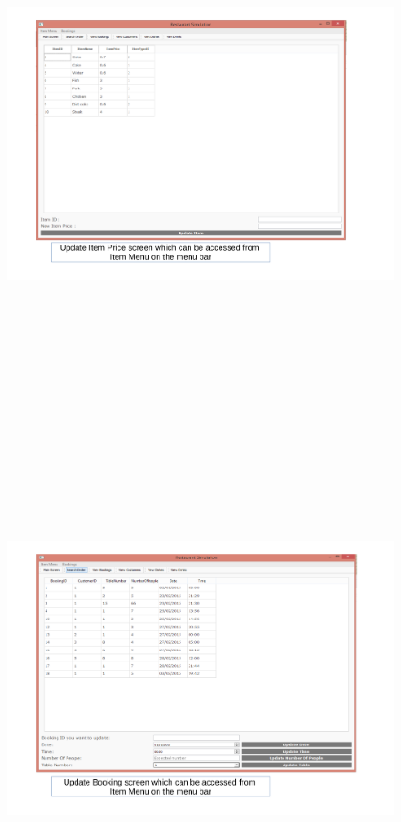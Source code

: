 \begin{landscape}
\begin{figure}[H]
    \includegraphics[height = 15cm]{./Maintenance/images/screen7}
    \caption{} \label{fig:screen7}
\end{figure}

\begin{figure}[H]
    \includegraphics[height = 15cm]{./Maintenance/images/screen8}
    \caption{} \label{fig:screen8}
\end{figure}


\end{landscape}
